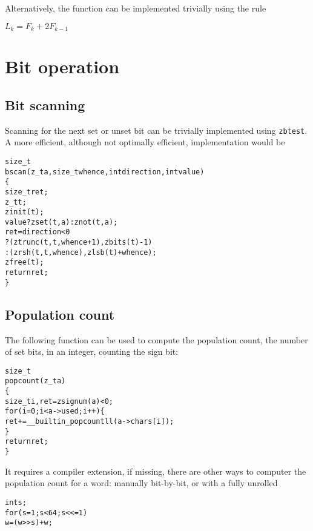 \noindent
Alternatively, the function can be implemented
trivially using the rule

\vspace{1em}
\( \displaystyle{
    L_k = F_k + 2F_{k - 1}
}\)


\newpage
\section{Bit operation}
\label{sec:Bit operation unimplemented}

\subsection{Bit scanning}
\label{sec:Bit scanning}

Scanning for the next set or unset bit can be
trivially implemented using {\tt zbtest}. A
more efficient, although not optimally efficient,
implementation would be

\begin{alltt}
   size_t
   bscan(z_t a, size_t whence, int direction, int value)
   \{
       size_t ret;
       z_t t;
       zinit(t);
       value ? zset(t, a) : znot(t, a);
       ret = direction < 0
           ? (ztrunc(t, t, whence + 1), zbits(t) - 1)
           : (zrsh(t, t, whence), zlsb(t) + whence);
       zfree(t);
       return ret;
   \}
\end{alltt}


\subsection{Population count}
\label{sec:Population count}

The following function can be used to compute
the population count, the number of set bits,
in an integer, counting the sign bit:

\begin{alltt}
   size_t
   popcount(z_t a)
   \{
       size_t i, ret = zsignum(a) < 0;
       for (i = 0; i < a->used; i++) \{
           ret += __builtin_popcountll(a->chars[i]);
       \}
       return ret;
   \}
\end{alltt}

\noindent
It requires a compiler extension, if missing,
there are other ways to computer the population
count for a word: manually bit-by-bit, or with
a fully unrolled

\begin{alltt}
   int s;
   for (s = 1; s < 64; s <<= 1)
       w = (w >> s) + w;
\end{alltt}


